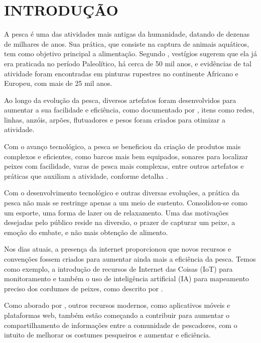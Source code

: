 
\chapter{INTRODUÇÃO}
\label{chap:introducao}

A pesca é uma das atividades mais antigas da humanidade, datando de dezenas de milhares de anos. Sua prática, que consiste na captura de animais aquáticos, tem como objetivo principal a alimentação. Segundo \textcite{afonso2007breves}, vestígios sugerem que ela já era praticada no período Paleolítico, há cerca de 50 mil anos, e evidências de tal atividade foram encontradas em pinturas rupestres no continente Africano e Europeu, com mais de 25 mil anos.

Ao longo da evolução da pesca, diversos artefatos foram desenvolvidos para aumentar a sua facilidade e eficiência, como documentado por \textcite{afonso2007breves}, itens como redes, linhas, anzóis, arpões, flutuadores e pesos foram criados para otimizar a atividade.

Com o avanço tecnológico, a pesca se beneficiou da criação de produtos mais complexos e eficientes, como barcos mais bem equipados, sonares para localizar peixes com facilidade, varas de pesca mais complexas, entre outros artefatos e práticas que auxiliam a atividade, conforme detalha \textcite{oliveira2020v}.

Com o desenvolvimento tecnológico e outras diversas evoluções, a prática da pesca não mais se restringe apenas a um meio de sustento. Consolidou-se como um esporte, uma forma de lazer ou de relaxamento. Uma das motivações desejadas pelo público reside na diversão, o prazer de capturar um peixe, a emoção do embate, e não mais obtenção de alimento.

Nos dias atuais, a presença da internet proporcionou que novos recursos e convenções fossem criados para aumentar ainda mais a eficiência da pesca. Temos como exemplo, a introdução de recursos de Internet das Coisas (IoT) para monitoramento e também o uso de inteligência artificial (IA) para mapeamento preciso dos cordumes de peixes, como descrito por \textcite{nassiff2025frota}.

Como aborado por \textcite{skov2021expert}, outros recursos modernos, como aplicativos móveis e plataformas web, também estão começando a contribuir para aumentar o compartilhamento de informações entre a comunidade de pescadores, com o intuito de melhorar os costumes pesqueiros e aumentar e eficiência.

